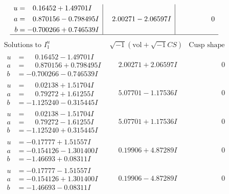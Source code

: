 \documentclass[1p]{elsarticle_modified}
\theoremstyle{definition}
\newcommand{\I}{\sqrt{-1}}
\begin{document}
$$\begin{array}{c|c|c}
\begin{aligned}
u &= \phantom{-}0.16452 + 1.49701 I \\
a &= \phantom{-}0.870156 - 0.798495 I \\
b &= -0.700266 + 0.746539 I\end{aligned}
 & \phantom{-}2.00271 - 2.06597 I & \phantom{-0.000000 } 0\\
 \hline 
 \end{array}$$\newpage$$\begin{array}{c|c|c}  
\text{Solutions to }I^u_{1}& \I (\text{vol} + \sqrt{-1}CS) & \text{Cusp shape}\\
 \hline 
\begin{aligned}
u &= \phantom{-}0.16452 - 1.49701 I \\
a &= \phantom{-}0.870156 + 0.798495 I \\
b &= -0.700266 - 0.746539 I\end{aligned}
 & \phantom{-}2.00271 + 2.06597 I & \phantom{-0.000000 } 0 \\ \hline\begin{aligned}
u &= \phantom{-}0.02138 + 1.51704 I \\
a &= \phantom{-}0.79272 + 1.61255 I \\
b &= -1.125240 - 0.315445 I\end{aligned}
 & \phantom{-}5.07701 - 1.17536 I & \phantom{-0.000000 } 0 \\ \hline\begin{aligned}
u &= \phantom{-}0.02138 - 1.51704 I \\
a &= \phantom{-}0.79272 - 1.61255 I \\
b &= -1.125240 + 0.315445 I\end{aligned}
 & \phantom{-}5.07701 + 1.17536 I & \phantom{-0.000000 } 0 \\ \hline\begin{aligned}
u &= -0.17777 + 1.51557 I \\
a &= -0.154126 - 1.301400 I \\
b &= -1.46693 + 0.08311 I\end{aligned}
 & \phantom{-}0.19906 + 4.87289 I & \phantom{-0.000000 } 0 \\ \hline\begin{aligned}
u &= -0.17777 - 1.51557 I \\
a &= -0.154126 + 1.301400 I \\
b &= -1.46693 - 0.08311 I\end{aligned}
 & \phantom{-}0.19906 - 4.87289 I & \phantom{-0.000000 } 0 \\ \hline\begin{aligned}

\end{aligned}
\end{array}$$
\end{document}
